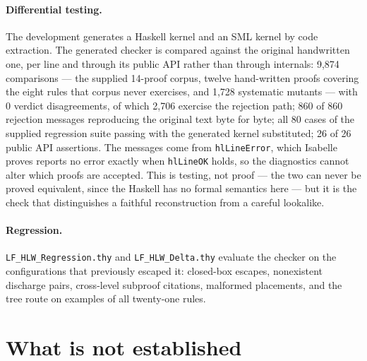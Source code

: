 \documentclass[11pt]{article}
\theoremstyle{plain}
\newcommand{\ubrk}{\_\discretionary{}{}{}}
\newcommand{\isa}[1]{\textup{\texttt{\small #1}}}
\newcommand{\thy}[1]{\textup{\texttt{\small #1}}}
\begin{document}
\paragraph{Differential testing.} The development generates a Haskell kernel
and an SML kernel by code extraction. The generated checker is compared against
the original handwritten one, per line and through its public API rather than
through internals: 9{,}874 comparisons --- the supplied 14-proof corpus,
twelve hand-written proofs covering the eight rules that corpus never
exercises, and 1{,}728 systematic mutants --- with 0 verdict disagreements, of
which 2{,}706 exercise the rejection path; 860 of 860 rejection messages
reproducing the original text byte for byte; all 80 cases of the supplied
regression suite passing with the generated kernel substituted; 26 of 26 public
API assertions. The messages come from \isa{hlLineError}, which Isabelle proves
reports no error exactly when \isa{hlLineOK} holds, so the diagnostics cannot
alter which proofs are accepted. This is testing, not proof --- the two can never
be proved equivalent, since the Haskell has no formal semantics here --- but it
is the check that distinguishes a faithful reconstruction from a careful
lookalike.

\paragraph{Regression.} \thy{LF\ubrk{}HLW\ubrk{}Regression.thy} and
\thy{LF\ubrk{}HLW\ubrk{}Delta.thy} evaluate the checker on the configurations that
previously escaped it: closed-box escapes, nonexistent discharge pairs,
cross-level subproof citations, malformed placements, and the tree route on
examples of all twenty-one rules.

\section{What is not established}\label{sec:limits}
\end{document}
